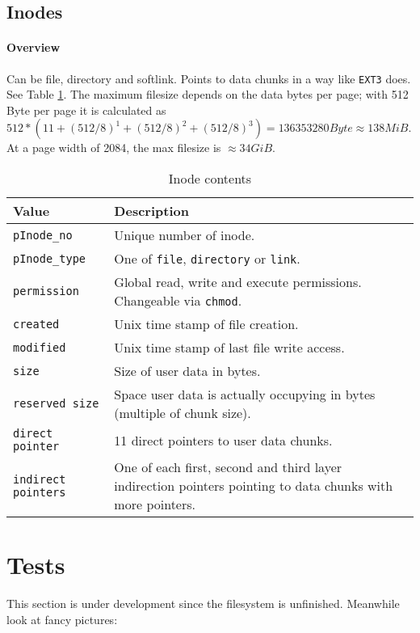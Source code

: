 \subsection{Inodes}
\label{inode}
\paragraph{Overview}
Can be file, directory and softlink. Points to data chunks in a way like \texttt{EXT3} does. See Table \ref{tab:pinode}. The maximum filesize depends on the data bytes per page; with 512 Byte per page it is calculated as 
$512 * (11 + (512/8)^1 + (512/8)^2 + (512/8)^3) = 136353280 Byte \approx 138 MiB$. At a page width of 2084, the max filesize is $\approx 34 GiB$.
\begin{table}[htbp]
	\caption{Inode contents}
	\label{tab:pinode}
	\begin{tabularx}{\textwidth}{lp{11cm}p{2.5cm}}
		\toprule
		Value & Description\\
		\midrule
		\texttt{pInode\_no} & Unique number of inode. \\
		\texttt{pInode\_type} & One of \texttt{file}, \texttt{directory} or \texttt{link}.\\
		\texttt{permission} & Global read, write and execute permissions. Changeable via \texttt{chmod}.\\
		\texttt{created} & Unix time stamp of file creation.\\
		\texttt{modified} & Unix time stamp of last file write access.\\
		\texttt{size} & Size of user data in bytes. \\
		\texttt{reserved size} & Space user data is actually occupying in bytes (multiple of chunk size).\\
		\texttt{direct pointer} & 11 direct pointers to user data chunks.\\
		\texttt{indirect pointers} & One of each first, second and third layer indirection pointers pointing to data chunks with more pointers.\\
		\bottomrule
	\end{tabularx}
\end{table} 

\section{Tests}
\begin{flushleft}
	
\end{flushleft}
This section is under development since the filesystem is unfinished. Meanwhile look at fancy pictures:

